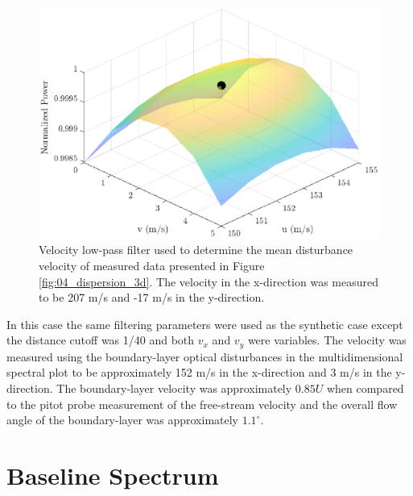 \begin{figure}
 \centering
 \includegraphics{../matlab/06_single_sensor_filtering/filter_velocity_real.eps}
 \caption{Velocity low-pass filter used to determine the mean disturbance velocity of measured data presented in Figure \ref{fig:04_dispersion_3d}.  The velocity in the x-direction was measured to be 207 m/s and -17 m/s in the y-direction.}
 \label{fig:06_filter_velocity_real}
\end{figure}
In this case the same filtering parameters were used as the synthetic case except the distance cutoff was 1/40 and both $v_x$ and $v_y$ were variables.
The velocity was measured using the boundary-layer optical disturbances in the multidimensional spectral plot to be approximately 152 m/s in the x-direction and 3 m/s in the y-direction.
The boundary-layer velocity was approximately $0.85U$ when compared to the pitot probe measurement of the free-stream velocity and the overall flow angle of the boundary-layer was approximately $1.1^\circ$.

\section{Baseline Spectrum}


